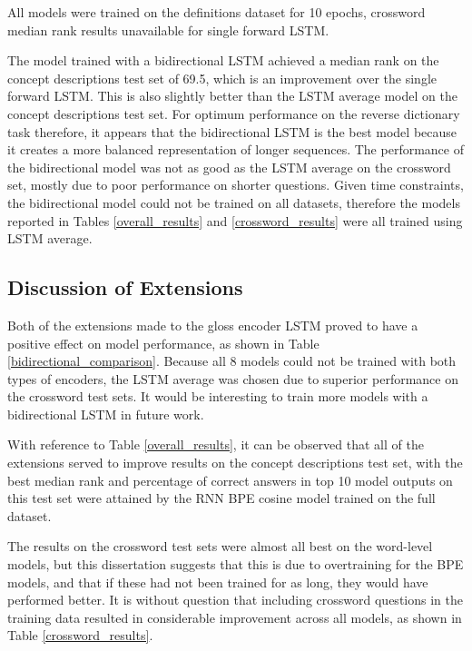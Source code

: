 \documentclass[11pt]{article}
\begin{document}
\begin{spacing}{1}
\begin{table}[!htpb]
All models were trained on the definitions dataset for 10 epochs, crossword median rank results unavailable for single forward LSTM.
\end{table}

The model trained with a bidirectional LSTM achieved a median rank on the concept descriptions test set of 69.5, which is an improvement over the single forward LSTM. This is also slightly better than the LSTM average model on the concept descriptions test set. For optimum performance on the reverse dictionary task therefore, it appears that the bidirectional LSTM is the best model because it creates a more balanced representation of longer sequences. The performance of the bidirectional model was not as good as the LSTM average on the crossword set, mostly due to poor performance on shorter questions. Given time constraints, the bidirectional model could not be trained on all datasets, therefore the models reported in Tables \ref{overall_results} and \ref{crossword_results} were all trained using LSTM average.

\subsection{Discussion of Extensions}
Both of the extensions made to the gloss encoder LSTM proved to have a positive effect on model performance, as shown in Table \ref{bidirectional_comparison}. Because all 8 models could not be trained with both types of encoders, the LSTM average was chosen due to superior performance on the crossword test sets. It would be interesting to train more models with a bidirectional LSTM in future work.

With reference to Table \ref{overall_results}, it can be observed that all of the extensions served to improve results on the concept descriptions test set, with the best median rank and percentage of correct answers in top 10 model outputs on this test set were attained by the RNN BPE cosine model trained on the full dataset. 

The results on the crossword test sets were almost all best on the word-level models, but this dissertation suggests that this is due to overtraining for the BPE models, and that if these had not been trained for as long, they would have performed better. It is without question that including crossword questions in the training data resulted in considerable improvement across all models, as shown in Table \ref{crossword_results}. 


\end{spacing}
\end{document}
